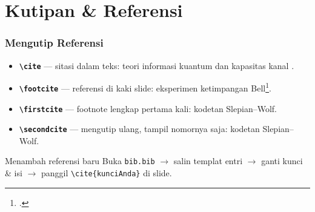 \section{Kutipan \& Referensi}

\begin{frame}
  \frametitle{Mengutip Referensi}
  {\footnotesize
  \begin{itemize}
    \item \textbf{\texttt{\textbackslash cite}} --- sitasi dalam teks:
          teori informasi kuantum \cite{barnett2009quantum} dan kapasitas kanal \cite{djordjevic2019physical}.
    \item \textbf{\texttt{\textbackslash footcite}} --- referensi di kaki slide:
          eksperimen ketimpangan Bell\footcite{aspect1999bell}.
    \item \textbf{\texttt{\textbackslash firstcite}} --- footnote lengkap pertama kali:
          kodetan Slepian--Wolf.
    \item \textbf{\texttt{\textbackslash secondcite}} --- mengutip ulang, tampil nomornya saja:
          kodetan Slepian--Wolf.
  \end{itemize}

  \medskip
  \begin{block}{Menambah referensi baru}
    Buka \texttt{bib.bib} $\rightarrow$ salin templat entri $\rightarrow$ ganti kunci
    \& isi $\rightarrow$ panggil \texttt{\textbackslash cite\{kunciAnda\}} di slide.
  \end{block}}
\end{frame}

